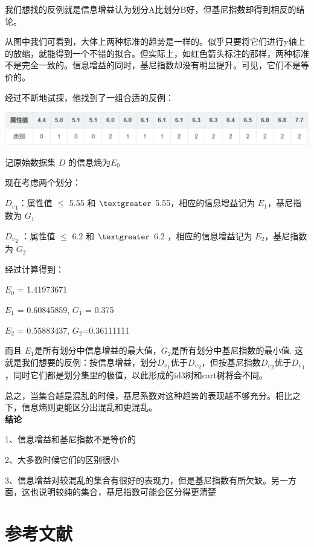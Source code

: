 \documentclass[lang=cn,11pt]{elegantpaper}
\begin{document}
我们想找的反例就是信息增益认为划分A比划分B好，但基尼指数却得到相反的结论。

从图中我们可看到，大体上两种标准的趋势是一样的。似乎只要将它们进行y轴上的放缩，就能得到一个不错的拟合。但实际上，如红色箭头标注的那样，两种标准不是完全一致的。信息增益的同时，基尼指数却没有明显提升。可见，它们不是等价的。

经过不断地试探，他找到了一组合适的反例：
\begin{center}
\includegraphics[scale=0.4]{pic3.png}\\
\end{center}

记原始数据集 $D$ 的信息熵为$E_0$​

现在考虑两个划分：

${D_v}_1$​ ：属性值 $\le$ 5.55 和 $\textgreater$ 5.55，相应的信息增益记为 $E_1$ ​，基尼指数为 $G_1$

${D_v}_2$ ：属性值 $\le$ 6.2 和 $\textgreater$ 6.2 ，相应的信息增益记为 $E_2$​，基尼指数为 $G_2$

经过计算得到：

$E_{0}$ = 1.41973671

$E_{1}$ = 0.60845859, \quad $G_{1}$ = 0.375

$E_{2}$ = 0.55883437, \quad $G_{2}$=0.36111111 

而且 $E_{1}$​是所有划分中信息增益的最大值，$ G_{2}$​是所有划分中基尼指数的最小值.
这就是我们想要的反例：按信息增益，划分${D_v}_1$​优于${D_v}_2$，但按基尼指数${D_v}_2$优于${D_v}_1$​，同时它们都是划分集里的极值，以此形成的id3树和cart树将会不同。

总之，当集合越是混乱的时候，基尼系数对这种趋势的表现越不够充分。相比之下，信息熵则更能区分出混乱和更混乱。\\
\textbf{结论}

    1、信息增益和基尼指数不是等价的

    2、大多数时候它们的区别很小

    3、信息增益对较混乱的集合有很好的表现力，但是基尼指数有所欠缺。另一方面，这也说明较纯的集合，基尼指数可能会区分得更清楚


\section{参考文献}
\end{document}
